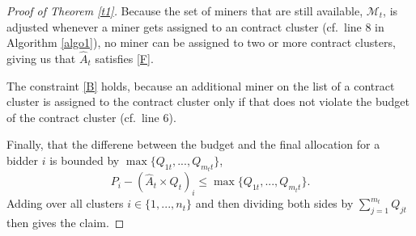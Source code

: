 \documentclass[11pt, a4paper, twocolumn]{article}
\begin{document}
\begin{proof}[Proof of Theorem \ref{t1}]
Because the set of miners that are still available, $\mathcal M_t$, is adjusted whenever a miner gets assigned to an contract cluster (cf.~line $8$ in Algorithm \ref{algo1}), no miner can be assigned to two or more contract clusters, giving us that $\hat A_t$ satisfies \eqref{F}.

The constraint \eqref{B} holds, because an additional miner on the list of a contract cluster is assigned to the contract cluster only if that does not violate the budget of the contract cluster (cf.~line $6$).

Finally, that the differene between the budget and the final allocation for a bidder $i$ is bounded by $\max \{Q_{1t},...,Q_{m_tt}\}$, $$P_i - (\hat A_t \times Q_t)_i \leq \max \{Q_{1t},...,Q_{m_tt}\}.$$ Adding over all clusters $i \in \{1,...,n_t\}$ and then dividing both sides by $\sum_{j=1}^{m_t}Q_{jt}$ then gives the claim. 
\end{proof}
\end{document}

